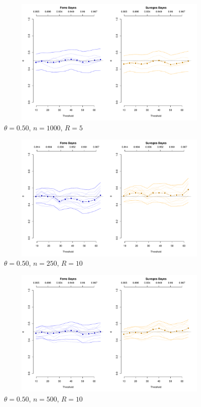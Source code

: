 \documentclass[12pt]{article}
\begin{document}
\begin{figure}
\begin{center}
\includegraphics[width=5.5in, height=2.45in]{../extremal_comparison/figs/sim_frechet_hier_50_1000_5.pdf}
\caption{$\theta=0.50$, $n=1000$, $R=5$}
\end{center}
\end{figure}

\newpage

\begin{figure}
\begin{center}
\includegraphics[width=5.5in, height=2.45in]{../extremal_comparison/figs/sim_frechet_hier_50_250_10.pdf}
\caption{$\theta=0.50$, $n=250$, $R=10$}
\end{center}
\end{figure}

\begin{figure}
\begin{center}
\includegraphics[width=5.5in, height=2.45in]{../extremal_comparison/figs/sim_frechet_hier_50_500_10.pdf}
\caption{$\theta=0.50$, $n=500$, $R=10$}
\end{center}
\end{figure}
\end{document}
